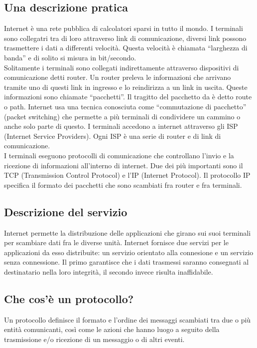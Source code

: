 \documentclass[11pt,a4paper]{book}
\begin{document}
\subsection{Una descrizione pratica}
Internet è una rete pubblica di calcolatori sparsi in tutto il mondo. I terminali sono collegatri tra di loro attraverso link di comunicazione, diversi link possono trasmettere i dati a differenti velocità. Questa velocità è chiamata “larghezza di banda” e di solito si misura in bit/secondo. \\
Solitamente i terminali sono collegati indirettamente attraverso dispositivi di comunicazione detti router. Un router preleva le informazioni che arrivano tramite uno di questi link in ingresso e lo reindirizza a un link in uscita. Queste informazioni sono chiamate “pacchetti”. Il tragitto del pacchetto da è detto route o path. Internet usa una tecnica conosciuta come “commutazione di pacchetto” (packet switching) che permette a più terminali di condividere un cammino o anche solo parte di questo.
I terminali accedono a internet attraverso gli ISP (Internet Service Providers). Ogni ISP è una serie di router e di link di comunicazione. \\
I terminali eseguono protocolli di comunicazione che controllano l’invio e la ricezione di informazioni all’interno di internet. Due dei più importanti sono il TCP (Transmission Control Protocol) e l’IP (Internet Protocol). Il protocollo IP specifica il formato dei pacchetti che sono scambiati fra router e fra terminali.

\subsection{Descrizione del servizio}
Internet permette la distribuzione delle applicazioni che girano sui suoi terminali per scambiare dati fra le diverse unità.
Internet fornisce due servizi per le applicazioni da esso distribuite: un servizio orientato alla connesione e un servizio senza connessione. Il primo garantisce che i dati trasmessi saranno consegnati al destinatario nella loro integrità, il secondo invece risulta inaffidabile.

\subsection{Che cos'è un protocollo?}
Un protocollo definisce il formato e l’ordine dei messaggi scambiati tra due o più entità comunicanti, così come le azioni che hanno luogo a seguito della trasmissione e/o ricezione di un messaggio o di altri eventi.
\end{document}
